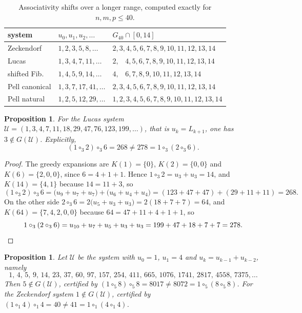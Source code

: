 \documentclass[11pt,reqno]{amsart}
\theoremstyle{plain}
\newtheorem{proposition}[theorem]{Proposition}
\theoremstyle{definition}
\newcommand{\Uu}{\mathcal{U}}
\begin{document}
\begin{table}[ht]
\centering
\small
\begin{tabular}{lll}
\toprule
system & $u_{0},u_{1},u_{2},\dots$ & $G_{40}\cap[0,14]$\\
\midrule
Zeckendorf     & $1,2,3,5,8,\dots$   & $2,3,4,5,6,7,8,9,10,11,12,13,14$\\
Lucas          & $1,3,4,7,11,\dots$  & $2,\ \ \ \,4,5,6,7,8,9,10,11,12,13,14$\\
shifted Fib.   & $1,4,5,9,14,\dots$  & $4,\ \ \ \,6,7,8,9,10,11,12,13,14$\\
Pell canonical & $1,3,7,17,41,\dots$ & $2,3,4,5,6,7,8,9,10,11,12,13,14$\\
Pell natural   & $1,2,5,12,29,\dots$ & $1,2,3,4,5,6,7,8,9,10,11,12,13,14$\\
\bottomrule
\end{tabular}
\medskip
\caption{Associativity shifts over a longer range, computed exactly for $n,m,p\le40$.}
\label{tab:focus}
\end{table}

\begin{proposition}\label{prop:lucas}
For the Lucas system $\Uu=(1,3,4,7,11,18,29,47,76,123,199,\dots)$, that is $u_{k}=L_{k+1}$, one has
$3\notin G(\Uu)$. Explicitly,
\[
  (1\circ_{3}2)\circ_{3}6=268\ne278=1\circ_{3}(2\circ_{3}6).
\]
\end{proposition}

\begin{proof}
The greedy expansions are $K(1)=\{0\}$, $K(2)=\{0,0\}$ and $K(6)=\{2,0,0\}$, since $6=4+1+1$.
Hence $1\circ_{3}2=u_{3}+u_{3}=14$, and $K(14)=\{4,1\}$ because $14=11+3$, so
\[
  (1\circ_{3}2)\circ_{3}6=\bigl(u_{9}+u_{7}+u_{7}\bigr)+\bigl(u_{6}+u_{4}+u_{4}\bigr)
  =(123+47+47)+(29+11+11)=268 .
\]
On the other side $2\circ_{3}6=2\bigl(u_{5}+u_{3}+u_{3}\bigr)=2(18+7+7)=64$, and
$K(64)=\{7,4,2,0,0\}$ because $64=47+11+4+1+1$, so
\[
  1\circ_{3}(2\circ_{3}6)=u_{10}+u_{7}+u_{5}+u_{3}+u_{3}=199+47+18+7+7=278 . \qedhere
\]
\end{proof}

\begin{proposition}\label{prop:others}
Let $\Uu$ be the system with $u_{0}=1$, $u_{1}=4$ and $u_{k}=u_{k-1}+u_{k-2}$, namely
\[
  1,\,4,\,5,\,9,\,14,\,23,\,37,\,60,\,97,\,157,\,254,\,411,\,665,\,1076,\,1741,\,2817,\,4558,\,7375,\dots
\]
Then $5\notin G(\Uu)$, certified by
$(1\circ_{5}8)\circ_{5}8=8017\ne8072=1\circ_{5}(8\circ_{5}8)$. For the Zeckendorf system
$1\notin G(\Uu)$, certified by $(1\circ_{1}4)\circ_{1}4=40\ne41=1\circ_{1}(4\circ_{1}4)$.
\end{proposition}
\end{document}
